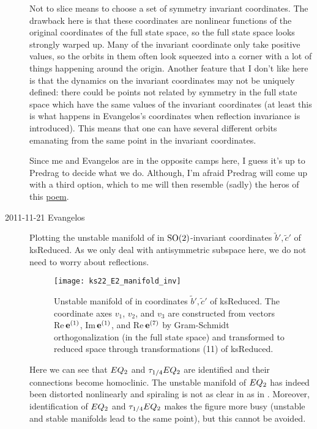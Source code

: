 \begin{description}
    Not to slice means to choose a set of symmetry invariant coordinates.  The drawback here is that these coordinates are nonlinear functions of the original coordinates of the full state space, so the full state space looks strongly warped up.  Many of the invariant coordinate only take positive values, so the orbits in them often look squeezed into a corner with a lot of things happening around the origin.  Another feature that I don't like here is that the dynamics on the invariant coordinates may not be uniquely defined: there could be points not related by symmetry in the full state space which have the same values of the invariant coordinates (at least this is what happens in Evangelos's coordinates when reflection invariance is introduced).  This means that one can have several different orbits emanating from the same point in the invariant coordinates.

    Since me and Evangelos are in the opposite camps here, I guess it's
    up to Predrag to decide what we do.  Although, I'm afraid Predrag
    will come up with a third option, which to me will then resemble
    (sadly) the heros of this
    \href{http://www.poemhunter.com/poem/swan-pike-and-crawfish/}{poem}.

\item[2011-11-21 Evangelos] Plotting the unstable manifold of  in $\SOn{2}$-invariant
coordinates $\tilde{b}',\tilde{c}'$ of ksReduced. As we only deal with antisymmetric subspace
here, we do not need to worry about reflections.

\begin{figure}[ht]
 \begin{center}
  \texttt{[image: ks22\_E2\_manifold\_inv]}
 \end{center}
\caption{Unstable manifold of  in coordinates
$\tilde{b}',\tilde{c}'$ of ksReduced. The coordinate axes $v_1$, $v_2$,
and $v_3$ are constructed from vectors Re\,$\jEigvec[1]$,
Im\,$\jEigvec[1]$, and {Re\,}$\jEigvec[7]$ by Gram-Schmidt
orthogonalization (in the full state space) and transformed to reduced space
through transformations (11) of ksReduced.
  }
\label{f:ks22_E2_inv}
\end{figure}

Here we can see that $\EQV{2}$ and $\tau_{1/4} \EQV{2}$ are identified and their
connections become homoclinic. The unstable manifold of $\EQV{2}$ has indeed been distorted
nonlinearly and spiraling is not as clear in  as in
. Moreover, identification of $\EQV{2}$ and $\tau_{1/4} \EQV{2}$
makes the figure more busy (unstable and stable manifolds lead to the same point), but this
cannot be avoided.


\end{description}
